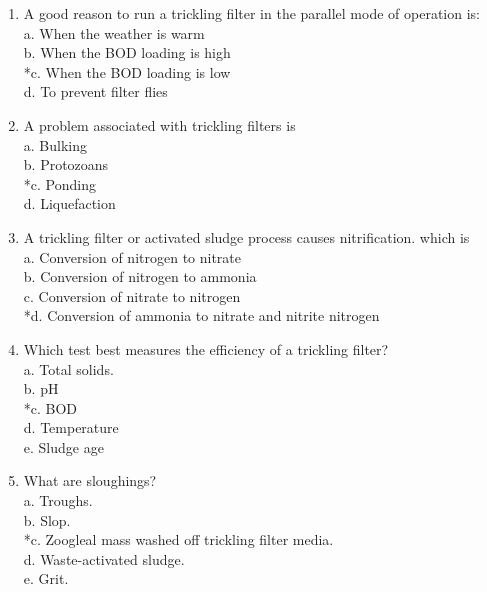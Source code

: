 \begin{enumerate}
\item  A good reason to run a trickling filter in the parallel mode of operation is: \\

 a. When the weather is warm \\
 b. When the BOD loading is high \\
 *c. When the BOD loading is low \\
 d. To prevent filter flies \\


\item  A problem associated with trickling filters is \\

 a. Bulking \\
 b. Protozoans \\
 *c. Ponding \\
 d. Liquefaction \\


\item  A trickling filter or activated sludge process causes nitrification. which is \\

 a. Conversion of nitrogen to nitrate \\
 b. Conversion of nitrogen to ammonia \\
 c. Conversion of nitrate to nitrogen \\
 *d. Conversion of ammonia to nitrate and nitrite nitrogen \\


\item  Which test best measures the efficiency of a trickling filter? \\

 a. Total solids. \\
 b. pH \\
 *c. BOD \\
 d. Temperature \\
 e. Sludge age \\


\item  What are sloughings? \\

 a. Troughs. \\
 b. Slop. \\
 *c. Zoogleal mass washed off trickling filter media. \\
 d. Waste-activated sludge. \\
 e. Grit. \\



\end{enumerate}
